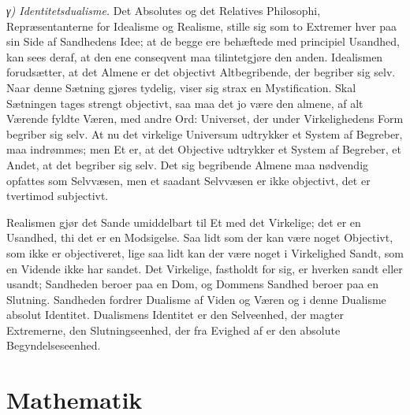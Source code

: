\documentclass[12pt]{book}
\newcommand{\apage}[1]{\marginnote{\footnotesize\textit{[#1]}}}
\begin{document}
\emph{γ) Identitetsdualisme.} Det Absolutes og det Relatives Philosophi,
Repræsentanterne for Idealisme og Realisme, stille sig som to Extremer hver
paa sin Side af Sandhedens Idee; at de begge ere behæftede med principiel
Usandhed, kan sees deraf, at den ene conseqvent maa tilintetgjøre den anden.
Idealismen forudsætter, at det Almene er det objectivt Altbegribende, der
begriber sig selv. Naar denne Sætning gjøres tydelig, viser sig strax en
Mystification. Skal Sætningen tages strengt objectivt, saa maa det jo være
den almene, af alt Værende fyldte Væren, med andre Ord: Universet, der
under Virkelighedens Form begriber sig selv. At nu det virkelige Universum
udtrykker et System af Begreber, maa indrømmes; men Et er, at det Objective
udtrykker et System af Begreber, et Andet, at det begriber sig selv. Det
sig begribende Almene maa nødvendig opfattes som Selvvæsen, men et saadant
Selvvæsen er ikke objectivt, det er tvertimod subjectivt.

Realismen gjør det Sande umiddelbart til Et med det Virkelige; det er en
Usandhed, thi det er en Modsigelse. Saa lidt som der kan være noget
\apage{117} Objectivt, som ikke er objectiveret, lige saa lidt kan der være noget i
Virkelighed Sandt, som en Vidende ikke har sandet. Det Virkelige, fastholdt
for sig, er hverken sandt eller usandt; Sandheden beroer paa en Dom, og
Dommens Sandhed beroer paa en Slutning. Sandheden fordrer Dualisme af Viden
og Væren og i denne Dualisme absolut Identitet. Dualismens Identitet er den
Selveenhed, der magter Extremerne, den Slutningseenhed, der fra Evighed af
er den absolute Begyndelseseenhed.

\section{Mathematik}
\label{sec:12}
\end{document}
